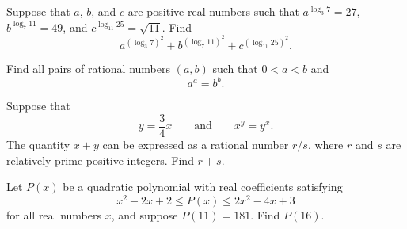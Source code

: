\begin{question}[name={2009 AIME II, \href{https://artofproblemsolving.com/community/c4p1455401}{Problem 2}}]
	Suppose that $ a$, $ b$, and $ c$ are positive real numbers such that $ a^{\log_3 7} = 27$, $ b^{\log_7 11} = 49$, and $ c^{\log_{11} 25} = \sqrt {11}$. Find
	\[ a^{(\log_3 7)^2} + b^{(\log_7 11)^2} + c^{(\log_{11} 25)^2}.
	\]
\end{question}


%	










\begin{question}[name={2020 USAMTS, Year 32, Round 1, \href{https://artofproblemsolving.com/community/c123h2314081p18414057}{Problem 5}}]
	Find all pairs of rational numbers $(a, b)$ such that $0 < a < b$ and $$a^a = b^b.$$
\end{question}


%	













\begin{question}[name={2010 AIME I, \href{https://artofproblemsolving.com/community/c4p1813828}{Problem 3}}]
	Suppose that $$ y = \frac34x \qquad \text{and} \qquad x^y = y^x.$$ The quantity $ x + y$ can be expressed as a rational number ${r}/{s}$, where $ r$ and $ s$ are relatively prime positive integers. Find $ r + s$.	
\end{question}


%	












\begin{question}[name={2010 AIME I, \href{https://artofproblemsolving.com/community/c4p1813817}{Problem 6}}]
	Let $ P(x)$ be a quadratic polynomial with real coefficients satisfying\[x^2 - 2x + 2 \le P(x) \le 2x^2 - 4x + 3\]for all real numbers $ x$, and suppose $ P(11) = 181$. Find $ P(16)$.
\end{question}


